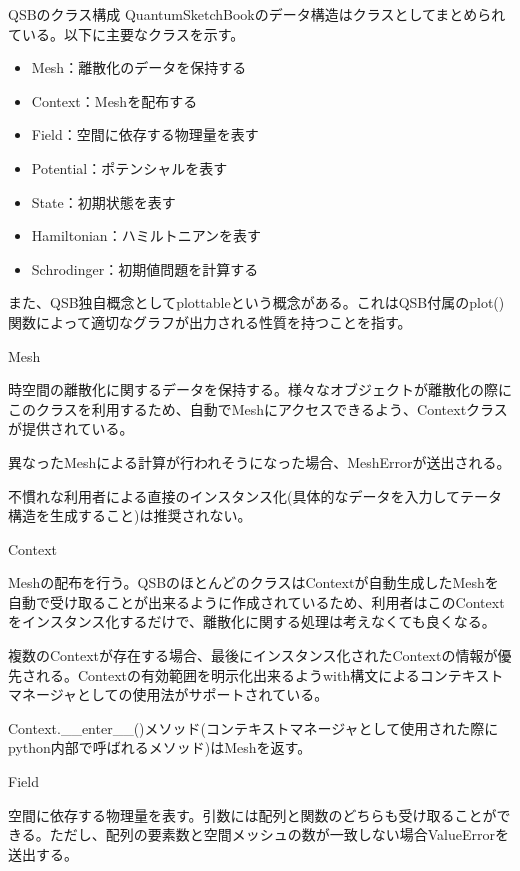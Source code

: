 \documentclass[a4paper, lualatex]{bxjsarticle}
\begin{document}
\begin{section}{QSBのクラス構成}
    QuantumSketchBookのデータ構造はクラスとしてまとめられている。以下に主要なクラスを示す。
    \begin{itemize}
        \item Mesh：離散化のデータを保持する
        \item Context：Meshを配布する
        \item Field：空間に依存する物理量を表す
        \item Potential：ポテンシャルを表す
        \item State：初期状態を表す
        \item Hamiltonian：ハミルトニアンを表す
        \item Schrodinger：初期値問題を計算する
    \end{itemize}
    \par また、QSB独自概念としてplottableという概念がある。これはQSB付属のplot()関数によって適切なグラフが出力される性質を持つことを指す。
    \begin{subsection}{Mesh}
        \par 時空間の離散化に関するデータを保持する。様々なオブジェクトが離散化の際にこのクラスを利用するため、自動でMeshにアクセスできるよう、Contextクラスが提供されている。
        \par 異なったMeshによる計算が行われそうになった場合、MeshErrorが送出される。
        \par 不慣れな利用者による直接のインスタンス化(具体的なデータを入力してテータ構造を生成すること)は推奨されない。
    \end{subsection}
    \begin{subsection}{Context}
        \par Meshの配布を行う。QSBのほとんどのクラスはContextが自動生成したMeshを自動で受け取ることが出来るように作成されているため、利用者はこのContextをインスタンス化するだけで、離散化に関する処理は考えなくても良くなる。
        \par 複数のContextが存在する場合、最後にインスタンス化されたContextの情報が優先される。Contextの有効範囲を明示化出来るようwith構文によるコンテキストマネージャとしての使用法がサポートされている。
        \par Context.\_\_enter\_\_()メソッド(コンテキストマネージャとして使用された際にpython内部で呼ばれるメソッド)はMeshを返す。
    \end{subsection}
    \begin{subsection}{Field}
        \par 空間に依存する物理量を表す。引数には配列と関数のどちらも受け取ることができる。ただし、配列の要素数と空間メッシュの数が一致しない場合ValueErrorを送出する。

\end{subsection}
\end{section}
\end{document}
